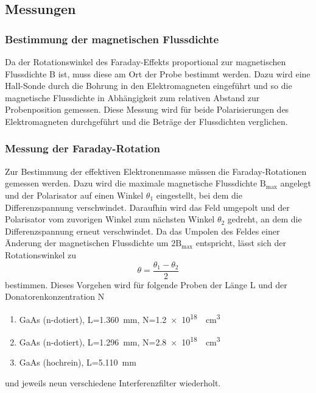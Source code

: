     \subsection{Messungen}
        \subsubsection*{Bestimmung der magnetischen Flussdichte}
            Da der Rotationswinkel des Faraday-Effekts proportional zur magnetischen Flussdichte B ist, muss diese am Ort der Probe bestimmt werden. Dazu wird eine Hall-Sonde durch die Bohrung in den Elektromagneten eingeführt und so die magnetische Flussdichte in Abhängigkeit zum relativen Abstand zur Probenposition gemessen. Diese Messung wird für beide Polarisierungen des Elektromagneten durchgeführt und die Beträge der Flussdichten verglichen.
        \newpage   
        \subsubsection*{Messung der Faraday-Rotation}
            Zur Bestimmung der effektiven Elektronenmasse müssen die Faraday-Rotationen gemessen werden. Dazu wird die maximale magnetische Flussdichte $\text{B}_{\text{max}}$ angelegt und der Polarisator auf einen Winkel $\theta_1$ eingestellt, bei dem die Differenzspannung verschwindet. Daraufhin wird das Feld umgepolt und der Polarisator vom zuvorigen Winkel zum nächsten Winkel $\theta_2$ gedreht, an dem die Differenzspannung erneut verschwindet. Da das Umpolen des Feldes einer Änderung der magnetischen Flussdichte um $2\text{B}_{\text{max}}$ entspricht, lässt sich der Rotationswinkel zu 
            \begin{equation}
                \theta = \frac{\theta_1 - \theta_2}{2}
                \label{eqn:zweiwinkel}
            \end{equation}
            bestimmen. Dieses Vorgehen wird für folgende Proben der Länge L und der Donatorenkonzentration N
            \begin{enumerate}
                \item GaAs (n-dotiert), L=\SI{1.360}{\milli\metre}, N=\SI{1.2e18}{\per\cubic\centi\metre}
                \item GaAs (n-dotiert), L=\SI{1.296}{\milli\metre}, N=\SI{2.8e18}{\per\cubic\centi\metre}
                \item GaAs (hochrein), L=\SI{5.110}{\milli\metre}
            \end{enumerate}
            

            und jeweils neun verschiedene Interferenzfilter wiederholt.

        
